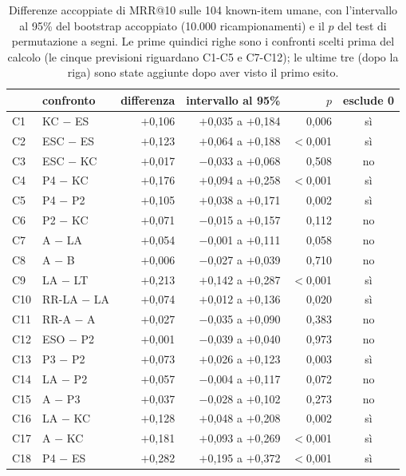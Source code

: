 \begin{table}[ht]
  \centering
  \small
  \begin{tabular}{llrrrc}
    \toprule
    & confronto & differenza & intervallo al 95\% & $p$ & esclude 0 \\
    \midrule
    C1 & KC $-$ ES & $+$0,106 & $+$0,035 a $+$0,184 & 0,006 & sì \\
    C2 & ESC $-$ ES & $+$0,123 & $+$0,064 a $+$0,188 & $<$0,001 & sì \\
    C3 & ESC $-$ KC & $+$0,017 & $-$0,033 a $+$0,068 & 0,508 & no \\
    C4 & P4 $-$ KC & $+$0,176 & $+$0,094 a $+$0,258 & $<$0,001 & sì \\
    C5 & P4 $-$ P2 & $+$0,105 & $+$0,038 a $+$0,171 & 0,002 & sì \\
    C6 & P2 $-$ KC & $+$0,071 & $-$0,015 a $+$0,157 & 0,112 & no \\
    C7 & A $-$ LA & $+$0,054 & $-$0,001 a $+$0,111 & 0,058 & no \\
    C8 & A $-$ B & $+$0,006 & $-$0,027 a $+$0,039 & 0,710 & no \\
    C9 & LA $-$ LT & $+$0,213 & $+$0,142 a $+$0,287 & $<$0,001 & sì \\
    C10 & RR-LA $-$ LA & $+$0,074 & $+$0,012 a $+$0,136 & 0,020 & sì \\
    C11 & RR-A $-$ A & $+$0,027 & $-$0,035 a $+$0,090 & 0,383 & no \\
    C12 & ESO $-$ P2 & $+$0,001 & $-$0,039 a $+$0,040 & 0,973 & no \\
    C13 & P3 $-$ P2 & $+$0,073 & $+$0,026 a $+$0,123 & 0,003 & sì \\
    C14 & LA $-$ P2 & $+$0,057 & $-$0,004 a $+$0,117 & 0,072 & no \\
    C15 & A $-$ P3 & $+$0,037 & $-$0,028 a $+$0,102 & 0,273 & no \\
    \midrule
    C16 & LA $-$ KC & $+$0,128 & $+$0,048 a $+$0,208 & 0,002 & sì \\
    C17 & A $-$ KC & $+$0,181 & $+$0,093 a $+$0,269 & $<$0,001 & sì \\
    C18 & P4 $-$ ES & $+$0,282 & $+$0,195 a $+$0,372 & $<$0,001 & sì \\
    \bottomrule
  \end{tabular}
  \caption{Differenze accoppiate di MRR@10 sulle 104 known-item umane, con
  l'intervallo al 95\% del bootstrap accoppiato (10.000 ricampionamenti) e il
  $p$ del test di permutazione a segni. Le prime quindici righe sono i
  confronti scelti prima del calcolo (le cinque previsioni riguardano C1-C5 e
  C7-C12); le ultime tre (dopo la riga) sono state aggiunte dopo aver visto
  il primo esito.}
  \label{tab:intervalli}
\end{table}

